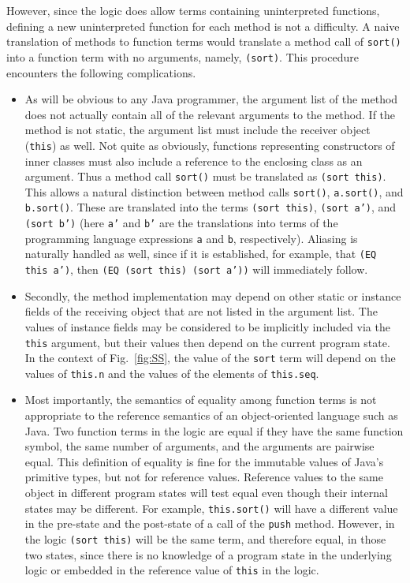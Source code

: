 \documentclass{sig-alternate}
\begin{document}
However, since the logic does allow terms containing uninterpreted functions, defining a new
uninterpreted function for each method is not a difficulty.  A naive translation of methods to
function terms would translate a method call of \texttt{sort()} into a function term with no
arguments, namely, \texttt{(sort)}.  This procedure encounters the following complications.
\begin{itemize}
\item
As will be obvious to any Java programmer, the argument list of the method does not 
actually contain all of the relevant arguments to the method.  If the method is not static, the
argument list must include the receiver object (\texttt{this}) as well.  Not quite as obviously,
functions representing constructors of inner classes must also include a reference to the
enclosing class as an argument.  Thus a method call 
\texttt{sort()} must be translated as \texttt{(sort this)}.
This allows a natural distinction between method calls \texttt{sort()}, \texttt{a.sort()}, and
\texttt{b.sort()}.  These are translated into the terms \texttt{(sort this)}, \texttt{(sort a')}, and
\texttt{(sort b')} (here \texttt{a'} and \texttt{b'} are the translations into terms of
the programming language expressions \texttt{a} and \texttt{b}, respectively).  
Aliasing is naturally handled as well, since if it is established, for example, that
\texttt{(EQ this a')}, then \texttt{(EQ (sort this) (sort a'))} will immediately follow.

\item
Secondly, the method implementation may depend on other static or instance fields
of the receiving object that are not listed in the argument list.  The values of instance fields
may be considered to be implicitly included via the \texttt{this} argument, but their values then
depend on the current program state.  In the context of Fig.~\ref{fig:SS}, 
the value of the \texttt{sort} term
will depend on the values of \texttt{this.n} and the values of the elements of \texttt{this.seq}.

\item
Most importantly, the semantics of equality among function terms is not appropriate to the
reference semantics of an object-oriented language such as Java.  Two function terms in the
logic are equal if they have the same function symbol, the same number of arguments, and the
arguments are pairwise equal.  This definition of equality is fine for the immutable
values of Java's primitive types, but not for reference values.  Reference values to the
same object in different program
states will test equal even though their internal states may be different.  For example,
\texttt{this.sort()} will have a different value in the pre-state and the post-state of a call of the 
\texttt{push} method.  However, in the logic \texttt{(sort this)} will be the same term, and therefore
equal, in those two states, since there is no knowledge of a program state in the underlying
logic or embedded in the reference value of \texttt{this} in the logic.
\end{itemize}
\end{document}
